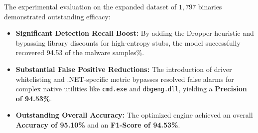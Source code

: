\documentclass[11pt,a4paper]{article}
\begin{document}
The experimental evaluation on the expanded dataset of $1,797$ binaries demonstrated outstanding efficacy:
\begin{itemize}
    \item \textbf{Significant Detection Recall Boost:} By adding the Dropper heuristic and bypassing library discounts for high-entropy stubs, the model successfully recovered 94.53 of the malware samples\%.
    \item \textbf{Substantial False Positive Reductions:} The introduction of driver whitelisting and .NET-specific metric bypasses resolved false alarms for complex native utilities like \texttt{cmd.exe} and \texttt{dbgeng.dll}, yielding a \textbf{Precision of 94.53\%}.
    \item \textbf{Outstanding Overall Accuracy:} The optimized engine achieved an overall \textbf{Accuracy of 95.10\%} and an \textbf{F1-Score of 94.53\%}.
\end{itemize}
\end{document}
